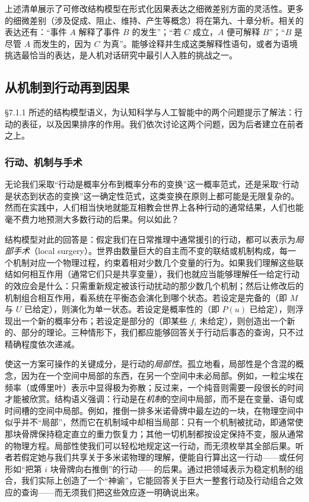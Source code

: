 上述清单展示了可修改结构模型在形式化因果表达之细微差别方面的灵活性。更多的细微差别（涉及促成、阻止、维持、产生等概念）将在第九、十章分析。相关的表达还有：“事件 $A$ 解释了事件 $B$ 的发生”；“若 $C$ 成立，$A$ 便可解释 $B$”；“$B$ 是尽管 $A$ 而发生的，因为 $C$ 为真”。能够诠释并生成这类解释性语句，或者为语境挑选最恰当的表达，是人机对话研究中最引人入胜的挑战之一。

\subsection{从机制到行动再到因果}

\S 7.1.1 所述的结构模型语义，为认知科学与人工智能中的两个问题提示了解法：行动的表征，以及因果排序的作用。我们依次讨论这两个问题，因为后者建立在前者之上。

\subsubsection*{行动、机制与手术}

无论我们采取“行动是概率分布到概率分布的变换”这一概率范式，还是采取“行动是状态到状态的变换”这一确定性范式，这类变换在原则上都可能是无限复杂的。然而在实践中，人们相当快地就能互相教会世界上各种行动的通常结果，人们也能毫不费力地预测大多数行动的后果。何以如此？

结构模型对此的回答是：假定我们在日常推理中通常援引的行动，都可以表示为\emph{局部手术}（local surgery）。世界由数量巨大的自主而不变的联结或机制构成，每一个机制对应一个物理过程，约束着相对少数几个变量的行为。如果我们理解这些联结如何相互作用（通常它们只是共享变量），我们也就应当能够理解任一给定行动的效应会是什么：只需重新规定被该行动扰动的那少数几个机制；然后让修改后的机制组合相互作用，看系统在平衡态会演化到哪个状态。若设定是完备的（即 $M$ 与 $U$ 已给定），则演化为单一状态。若设定是概率性的（即 $P(u)$ 已给定），则浮现出一个新的概率分布；若设定是部分的（即某些 $f_i$ 未给定），则创造出一个新的、部分的理论。三种情形下，我们都应能够回答关于行动后事态的查询，只不过精确程度依次递减。

使这一方案可操作的关键成分，是行动的\emph{局部性}。孤立地看，局部性是个含混的概念，因为在一个空间中局部的东西，在另一个空间中未必局部。例如，一粒尘埃在频率（或傅里叶）表示中显得极为弥散；反过来，一个纯音则需要一段很长的时间才能被欣赏。结构语义强调：行动是在\emph{机制}的空间中局部，而不是在变量、语句或时间槽的空间中局部。例如，推倒一排多米诺骨牌中最左边的一块，在物理空间中似乎并不“局部”，然而它在机制域中却相当局部：只有一个机制被扰动，即通常使那块骨牌保持稳定直立的重力恢复力；其他一切机制都按设定保持不变，服从通常的物理方程。局部性使我们可以轻松地规定这一行动，而无须枚举其全部后果。听者若假定她与我们共享关于多米诺物理的理解，便能自行算出这一行动——或任何形如“把第 $i$ 块骨牌向右推倒”的行动——的后果。通过把领域表示为稳定机制的组合，我们实际上创造了一个“神谕”，它能回答关于巨大一整套行动及行动组合之效应的查询——而无须我们把这些效应逐一明确说出来。

